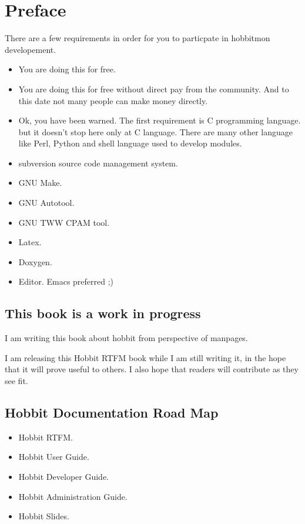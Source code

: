 \chapter{Preface}
\label{chap:preface}

There are a few requirements in order for you to particpate in hobbitmon developement.


\begin{itemize}
\item You are doing this for free.
\item You are doing this for free without direct pay from the
  community. And to this date not many people can make money directly.

\item Ok, you have been warned. The first requirement is C programming
  language. but it doesn't stop here only at C language. There are
  many other language like Perl, Python and shell language used to
  develop modules. 
\item subversion source code management system.
\item GNU Make.
\item GNU Autotool.
\item GNU TWW CPAM tool.
\item Latex.
\item Doxygen.
\item Editor. Emacs preferred ;)
 
\end{itemize}

\section{This book is a work in progress}

I am writing this  book about hobbit from perspective of manpages.  

I am releasing this Hobbit RTFM book while I am still writing it, in the hope that
it will prove useful to others.  I also hope that readers will contribute as they see fit.

\section{Hobbit Documentation Road Map}


\begin{itemize}
\item Hobbit RTFM.
\item Hobbit User Guide.
\item Hobbit Developer Guide.
\item Hobbit Administration Guide.
\item Hobbit Slides.

\end{itemize}

